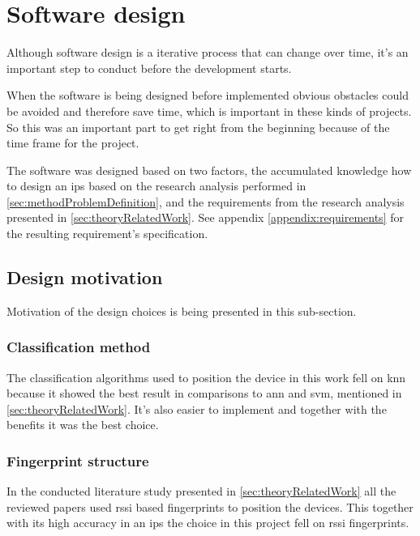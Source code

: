 \section{Software design}\label{sec:methodSoftwareDesign}
Although software design is a iterative process that can change over time, it's an important step to conduct before the development starts. \cite{EngineeringDesignIts1989, ImportanceBusinessProcess2008}

\bigskip

When the software is being designed before implemented obvious obstacles could be avoided and therefore save time, which is important in these kinds of projects.
So this was an important part to get right from the beginning because of the time frame for the project.

\bigskip

The software was designed based on two factors, the accumulated knowledge how to design an \acrshort{ips} based on the research analysis performed in \cref{sec:methodProblemDefinition}, and the requirements from the research analysis presented in \cref{sec:theoryRelatedWork}.
See appendix \ref{appendix:requirements} for the resulting requirement's specification.


\subsection{Design motivation}\label{sec:methodDesignMotivation}
Motivation of the design choices is being presented in this sub-section.


\subsubsection{Classification method}\label{sec:methodSoftwareDesignClassification}
The classification algorithms used to position the device in this work fell on \acrshort{knn} because it showed the best result in comparisons to \acrshort{ann} and \acrshort{svm}, mentioned in \cref{sec:theoryRelatedWork}.
It's also easier to implement and together with the benefits it was the best choice.


\subsubsection{Fingerprint structure}\label{sec:methodSoftwareDesignFingerprint}
In the conducted literature study presented in \cref{sec:theoryRelatedWork} all the reviewed papers used \acrfull{rssi} based fingerprints to position the devices.
This together with its high accuracy in an \acrshort{ips} the choice in this project fell on \acrshort{rssi} fingerprints.


